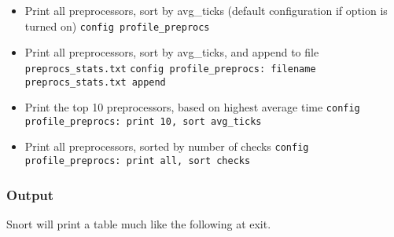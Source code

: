 \documentclass[english]{report}
\begin{document}
\begin{itemize}

\item Print all preprocessors, sort by avg\_ticks (default configuration if
option is turned on)
\subitem \texttt{config profile\_preprocs}

\item Print all preprocessors, sort by avg\_ticks, and append to file
\texttt{preprocs\_stats.txt} 
\subitem \texttt{config profile\_preprocs: filename \texttt{preprocs\_stats.txt} append}

\item Print the top 10 preprocessors, based on highest average time
\subitem \texttt{config profile\_preprocs: print 10, sort avg\_ticks}

\item Print all preprocessors, sorted by number of checks
\subitem \texttt{config profile\_preprocs: print all, sort checks}

\end{itemize}

\subsubsection{Output}

Snort will print a table much like the following at exit.
\end{document}
